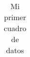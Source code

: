 \begin{table}[!ht]
\begin{center}
\begin{tabular}{|l|c|c|}
\hline
\end{tabular}
\end{center}
\caption{Mi primer cuadro de datos}
\label{tab}
\end{table}

